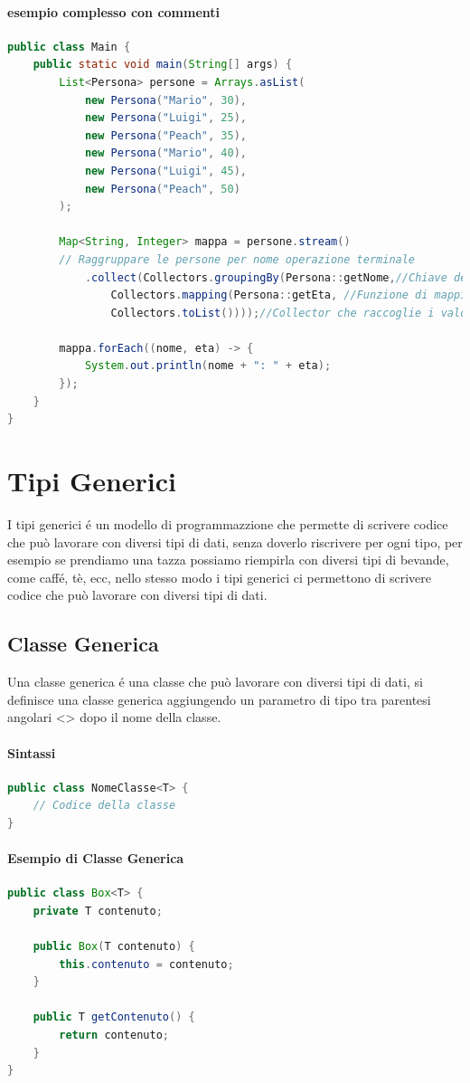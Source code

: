 \documentclass[11pt]{article}
\begin{document}
\paragraph{esempio complesso con commenti}
\begin{lstlisting}[language=Java]
public class Main {
    public static void main(String[] args) {
        List<Persona> persone = Arrays.asList(
            new Persona("Mario", 30),
            new Persona("Luigi", 25),
            new Persona("Peach", 35),
            new Persona("Mario", 40),
            new Persona("Luigi", 45),
            new Persona("Peach", 50)
        );

        Map<String, Integer> mappa = persone.stream()
        // Raggruppare le persone per nome operazione terminale
            .collect(Collectors.groupingBy(Persona::getNome,//Chiave della mappa
                Collectors.mapping(Persona::getEta, //Funzione di mapping serve a mappare l'elemento in un valore
                Collectors.toList())));//Collector che raccoglie i valori mappati in una lista

        mappa.forEach((nome, eta) -> {
            System.out.println(nome + ": " + eta);
        });
    }
}
\end{lstlisting}
\section{Tipi Generici}
I tipi generici é un modello di programmazzione che permette di scrivere codice che può lavorare con diversi tipi di dati, senza doverlo riscrivere per ogni tipo, per esempio se prendiamo una tazza possiamo riempirla con diversi tipi di bevande, come caffé, tè, ecc,
nello stesso modo i tipi generici ci permettono di scrivere codice che può lavorare con diversi tipi di dati.
\subsection{Classe Generica}
Una classe generica é una classe che può lavorare con diversi tipi di dati, si definisce una classe generica aggiungendo un parametro di tipo tra parentesi angolari <> dopo il nome della classe.
\paragraph{Sintassi}
\begin{lstlisting}[language=Java]
public class NomeClasse<T> {
    // Codice della classe
}
\end{lstlisting}
\paragraph{Esempio di Classe Generica}
\begin{lstlisting}[language=Java]
public class Box<T> {
    private T contenuto;

    public Box(T contenuto) {
        this.contenuto = contenuto;
    }

    public T getContenuto() {
        return contenuto;
    }
}
\end{lstlisting}
\end{document}
